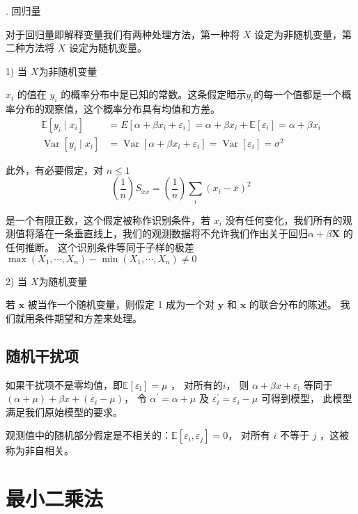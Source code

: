 {. 回归量}

对于回归量即解释变量我们有两种处理方法，第一种将 $X$ 设定为非随机变量，第二种方法将 $X$ 设定为随机变量。

1) 当 $X $为非随机变量

    $x_i$ 的值在 $y_i$ 的概率分布中是已知的常数。这条假定暗示$ y_i $的每一个值都是一个概率分布的观察值，这个概率分布具有均值和方差。
    \begin{align*}
   \mathbb{E}\left[y_{i} \mid x_{i}\right] & = E\left[\alpha+\beta x_{i}+\varepsilon_{i}\right]
   =\alpha+\beta x_{i} + \mathbb{E}\left[\varepsilon_{i}\right]=\alpha+\beta x_{i} \\
   \operatorname{Var}\left[y_{i} \mid x_{i}\right] & =\operatorname{Var}
   \left[\alpha+\beta x_{i}+\varepsilon_{i}\right]=\operatorname{Var}\left[\varepsilon_{i}\right]=\sigma^{2}
   \end{align*}

   此外，有必要假定，对 $n \leq 1$
   $$\left(\frac{1}{n}\right) S_{x x}=\left(\frac{1}{n}\right) \sum_{i}\left(x_{i}-\bar{x}\right)^{2}$$

    是一个有限正数，这个假定被称作识别条件，若 $x_i$ 没有任何变化，我们所有的观测值将落在一条垂直线上，我们的观测数据将不允许我们作出关于回归$\alpha +\beta \boldsymbol{X} $ 的任何推断。
    这个识别条件等同于子样的极差
   $\max \left(X_{1}, \cdots, X_{n}\right)-\min \left(X_{1}, \cdots, X_{n}\right) \neq 0$

2) 当 $ X $为随机变量

 若 $ {\boldsymbol{x}} $ 被当作一个随机变量，则假定 1 成为一个对 $ {\boldsymbol{y} }$ 和 $ { \boldsymbol{x} }$ 的联合分布的陈述。 我们就用条件期望和方差来处理。

 \subsection{随机干扰项}

 如果干扰项不是零均值，即$ \mathbb{E}\left[\varepsilon_{\mathrm{i}}\right]=\mu $ ， 对所有的$ i$，
 则 $ \alpha+\beta x+\varepsilon_{\mathrm{i}} $ 等同于$  (\alpha+\mu) +\beta x+\left(\varepsilon_{i}-\mu\right) $，
  令 $\alpha^{\prime}=\alpha+\mu $ 及 $ \varepsilon_{i}^{\prime}=\varepsilon_{i}-\mu $  可得到模型， 此模型满足我们原始模型的要求。 

 观测值中的随机部分假定是不相关的：$ \mathbb{E} \left[ \varepsilon_{i} ,\varepsilon_{j} \right]=0$， 对所有 $i$ 不等于 $j$ ，这被称为非自相关。

 \section{最小二乘法}
